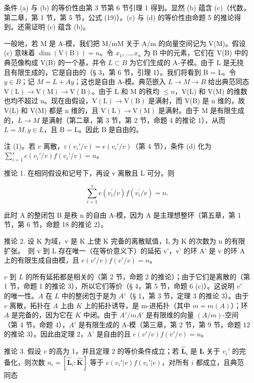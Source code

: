 条件 (a) 与 (b) 的等价性由第 3 节第 6 节引理 1 得到。显然 (b) 蕴含 (c)（代数，第二章，第 1 节，第 5 节，公式 (19)）。(c) 与 (d) 的等价性由命题 5 的推论得到。还需证明 (c) 蕴含 (b)。

一般地，若 M 是 A-模，我们把 M/mM 关于 A/m 的向量空间记为 V(M)。假设 (c) 意味着 \(\dim(\mathrm{V}(\mathrm{B})) = n\)。令 \(x_{1}, \ldots, x_{n}\) 为 B 中的元素，它们在 V(B) 中的典范像构成 V(B) 的一个基，并令 \(L \subset B\) 为它们生成的 A-子模。由于 L 是无挠且有限生成的，它是自由的（§ 3，第 6 节，引理 1）。我们将看到 B = L。令 \(y \in B\)；记 \(M = L + Ay\)；这也是自由 A-模。典范嵌入 \(L \to M \to B\) 给出典范同态 \(\mathrm{V}(\mathrm{L}) \to \mathrm{V}(\mathrm{M}) \to \mathrm{V}(\mathrm{B})\)。由于 L 和 M 的秩均 \(\leqslant n\)，V(L) 和 V(M) 的维数也均不超过 n。现在由假设，\(\mathrm{V}(\mathrm{L}) \to \mathrm{V}(\mathrm{B})\) 是满射，而 V(B) 是 n 维的，故 V(L) 和 V(M) 都是 n 维的，且 \(\mathrm{V}(\mathrm{L}) \to \mathrm{V}(\mathrm{M})\) 是满射。由于 M 是有限生成的，\(L \to M\) 是满射（第二章，第 3 节，第 2 节，命题 4 的推论 1），从而 \(L = M, y \in L\)，且 B = L。因此 B 是自由的。

注 (1)。若 \(v\) 离散，\(\varepsilon(v_i'/v) = e(v_i'/v)\)（第 4 节），条件 (d) 化为 \(\sum_{i=1}^{s} e(v_i'/v)f(v_i'/v) = n\)。

推论 1. 在相同假设和记号下，再设 v 离散且 L 可分。则

\[
\sum_ {i = 1} ^ {s} e (v _ {i} ^ {\prime} / v) f (v _ {i} ^ {\prime} / v) = n.
\]

此时 A 的整闭包 B 是秩 n 的自由 A-模，因为 A 是主理想整环（第五章，第 1 节，第 6 节，命题 18 的推论 2）。

推论 2. 设 K 为域，v 是 K 上使 K 完备的离散赋值，L 为 K 的次数为 n 的有限扩张。~则 v 到 L 存在唯一（在等价意义下）的延拓 v'，v' 的环 A' 是 v 的环 A 上的有限生成自由模，且 \(e(v'/v)f(v'/v)=n\)。

\(v\) 到 \(L\) 的所有延拓都是相关的（第 2 节，命题 2 的推论）；由于它们是离散的（第 1 节，命题 1 的推论 3），所以它们等价（§ 4，第 5 节，命题 6 (c)）。这说明 \(v'\) 的唯一性。\(A\) 在 \(L\) 中的整闭包于是为 \(A'\)（§ 1，第 3 节，定理 3 的推论 3）。由于 \(v\) 离散，拓扑在 \(A\) 上由 \(K\) 上的拓扑诱导，是 m-进拓扑（其中 \(m = m(A)\)）；环 \(A\) 是完备的，因为它在 \(K\) 中闭。由于 \(A'/mA'\) 是有限维的向量 \((A/m)\)-空间（第 4 节，命题 4），\(A'\) 是有限生成的 A-模（第三章，第 2 节，第 9 节，命题 12 的推论 3）。因此由定理 2，A' 是自由的且 \(e(v'/v)f(v'/v) = n\)。

推论 3. 假设 \(v\) 的高为 1，并且定理 2 的等价条件成立；若 \(\hat{\mathbf{L}}_i\) 是 \(\mathbf{L}\) 关于 \(v_i'\) 的完备化，则次数 \(n_i = [\hat{\mathbf{L}}_i: \hat{\mathbf{K}}]\) 等于 \(e(v_i'|v)f(v_i'|v)\)，对所有 \(i\) 都成立，且典范同态

